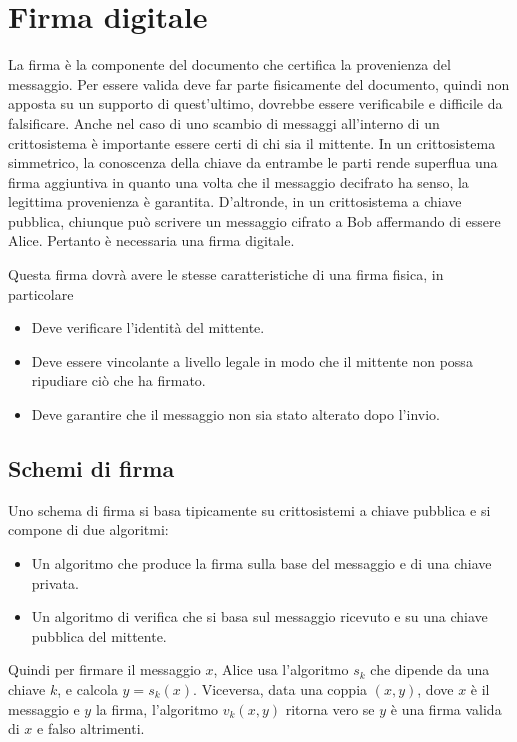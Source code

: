 \chapter{Firma digitale}
%
%
	La firma è la componente del documento che certifica la provenienza del messaggio. Per essere valida deve far parte fisicamente del documento, quindi non apposta su un supporto di quest'ultimo, dovrebbe essere verificabile e difficile da falsificare.
	Anche nel caso di uno scambio di messaggi all'interno di un crittosistema è importante essere certi di chi sia il mittente. In un crittosistema simmetrico, la conoscenza della chiave da entrambe le parti rende superflua una firma aggiuntiva in quanto una volta che il messaggio decifrato ha senso, la legittima provenienza è garantita.
	D'altronde, in un crittosistema a chiave pubblica, chiunque può scrivere un messaggio cifrato a Bob affermando di essere Alice. Pertanto è necessaria una firma digitale.

	Questa firma dovrà avere le stesse caratteristiche di una firma fisica, in particolare
	\begin{itemize}
		\item Deve verificare l'identità del mittente.
		\item Deve essere vincolante a livello legale in modo che il mittente non possa ripudiare ciò che ha firmato.
		\item Deve garantire che il messaggio non sia stato alterato dopo l'invio.
	\end{itemize}

\section{Schemi di firma}

	Uno schema di firma si basa tipicamente su crittosistemi a chiave pubblica e si compone di due algoritmi:
	\begin{itemize}
		\item Un algoritmo che produce la firma sulla base del messaggio e di una chiave privata.
		\item Un algoritmo di verifica che si basa sul messaggio ricevuto e su una chiave pubblica del mittente.
	\end{itemize}
	Quindi per firmare il messaggio \(x\), Alice usa l'algoritmo \(s_k\) che dipende da una chiave \(k\), e calcola \(y=s_k(x)\).
	Viceversa, data una coppia \((x,y)\), dove \(x\) è il messaggio e \(y\) la firma, l'algoritmo \(v_k(x,y)\) ritorna vero se \(y\) è una firma valida di \(x\) e falso altrimenti.

